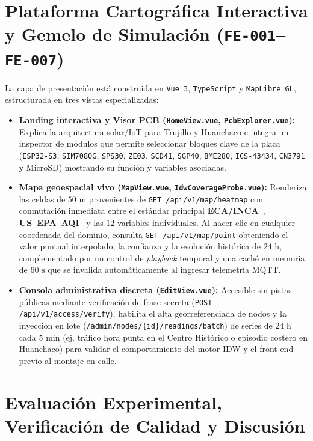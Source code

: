 \documentclass[conference]{IEEEtran}
\begin{document}
\section{Plataforma Cartográfica Interactiva y Gemelo de Simulación (\texttt{FE-001}--\texttt{FE-007})}

La capa de presentación está construida en \texttt{Vue~3}, \texttt{TypeScript} y \texttt{MapLibre GL}, estructurada en tres vistas especializadas:
\begin{itemize}
    \item \textbf{Landing interactiva y Visor PCB (\texttt{HomeView.vue}, \texttt{PcbExplorer.vue}):} Explica la arquitectura solar/IoT para Trujillo y Huanchaco e integra un inspector de módulos que permite seleccionar bloques clave de la placa (\texttt{ESP32-S3}, \texttt{SIM7080G}, \texttt{SPS30}, \texttt{ZE03}, \texttt{SCD41}, \texttt{SGP40}, \texttt{BME280}, \texttt{ICS-43434}, \texttt{CN3791} y MicroSD) mostrando su función y variables asociadas.
    \item \textbf{Mapa geoespacial vivo (\texttt{MapView.vue}, \texttt{IdwCoverageProbe.vue}):} Renderiza las celdas de $50\text{ m}$ provenientes de \texttt{GET /api/v1/map/heatmap} con conmutación inmediata entre el estándar principal \textbf{ECA/INCA}~\cite{minam2016inca}, \textbf{US~EPA~AQI}~\cite{usepa2024aqi} y las $12$ variables individuales. Al hacer clic en cualquier coordenada del dominio, consulta \texttt{GET /api/v1/map/point} obteniendo el valor puntual interpolado, la confianza y la evolución histórica de $24\text{ h}$, complementado por un control de \emph{playback} temporal y una caché en memoria de $60\text{ s}$ que se invalida automáticamente al ingresar telemetría MQTT.
    \item \textbf{Consola administrativa discreta (\texttt{EditView.vue}):} Accesible sin pistas públicas mediante verificación de frase secreta (\texttt{POST /api/v1/access/verify}), habilita el alta georreferenciada de nodos y la inyección en lote (\texttt{/admin/nodes/\{id\}/readings/batch}) de series de $24\text{ h}$ cada $5\text{ min}$ (ej. tráfico hora punta en el Centro Histórico o episodio costero en Huanchaco) para validar el comportamiento del motor IDW y el front-end previo al montaje en calle.
\end{itemize}

\section{Evaluación Experimental, Verificación de Calidad y Discusión}
\end{document}
